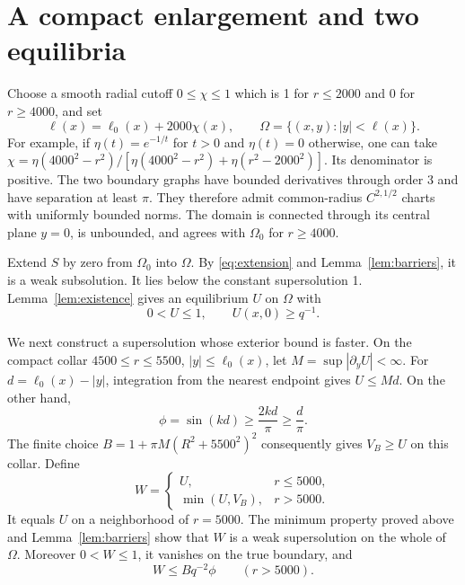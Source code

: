 \documentclass[11pt]{article}
\newcommand{\Om}{\Omega}
\begin{document}
\section{A compact enlargement and two equilibria}

Choose a smooth radial cutoff $0\leq\chi\leq1$ which is 1 for $r\leq2000$
and 0 for $r\geq4000$, and set
\begin{equation}\label{eq:domain}
 \ell(x)=\ell_0(x)+2000\chi(x),\qquad
 \Om=\{(x,y):|y|<\ell(x)\}.
\end{equation}
For example, if $\eta(t)=e^{-1/t}$ for $t>0$ and $\eta(t)=0$ otherwise, one
can take
$\chi=\eta(4000^2-r^2)/[\eta(4000^2-r^2)+\eta(r^2-2000^2)]$.
Its denominator is positive. The two boundary graphs have bounded derivatives
through order 3 and have separation at least $\pi$. They therefore admit
common-radius $C^{2,1/2}$ charts with uniformly bounded norms. The domain is
connected through its central plane $y=0$, is unbounded, and agrees with
$\Om_0$ for $r\geq4000$.

Extend $S$ by zero from $\Om_0$ into $\Om$. By
\eqref{eq:extension} and Lemma~\ref{lem:barriers}, it is a weak subsolution.
It lies below the constant supersolution 1. Lemma~\ref{lem:existence} gives
an equilibrium $U$ on $\Om$ with
\begin{equation}\label{eq:slow}
 0<U\leq1,\qquad U(x,0)\geq q^{-1}.
\end{equation}

We next construct a supersolution whose exterior bound is faster.
On the compact collar
$4500\leq r\leq5500$, $|y|\leq\ell_0(x)$, let
$M=\sup|\partial_yU|<\infty$.
For $d=\ell_0(x)-|y|$, integration from the nearest endpoint gives $U\leq Md$.
On the other hand,
\[
 \phi=\sin(kd)\geq\frac{2kd}{\pi}\geq\frac d\pi.
\]
The finite choice
$B=1+\pi M(R^2+5500^2)^2$ consequently gives $V_B\geq U$ on this collar.
Define
\begin{equation}\label{eq:patched}
 W=\begin{cases}U,&r\leq5000,\\ \min(U,V_B),&r>5000.\end{cases}
\end{equation}
It equals $U$ on a neighborhood of $r=5000$. The minimum property proved
above and Lemma~\ref{lem:barriers} show that $W$ is a weak supersolution on
the whole of $\Om$. Moreover $0<W\leq1$, it vanishes on the true boundary,
and
\begin{equation}\label{eq:fast}
 W\leq Bq^{-2}\phi\qquad(r>5000).
\end{equation}
\end{document}
